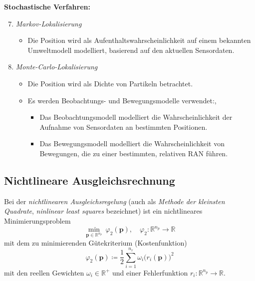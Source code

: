 \documentclass[a4paper, 11pt, accentcolor = tud3b]{tudreport}
\newcommand{\R}{\mathbb{R}}
\renewcommand{\vec}[1]{\boldsymbol{#1}}
\begin{document}
			\textbf{Stochastische Verfahren:}
			\begin{enumerate} \setcounter{enumi}{6}
				\item \emph{Markov-Lokalisierung}
					\begin{itemize}
						\item Die Position wird als Aufenthaltswahrscheinlichkeit auf einem bekannten Umweltmodell modelliert, basierend auf den aktuellen Sensordaten.
					\end{itemize}
				\item \emph{Monte-Carlo-Lokalisierung}
					\begin{itemize}
						\item Die Position wird als Dichte von Partikeln betrachtet.
						\item Es werden Beobachtungs- und Bewegungsmodelle verwendet:, 
							\begin{itemize}
								\item Das Beobachtungsmodell modelliert die Wahrscheinlichkeit der Aufnahme von Sensordaten an bestimmten Positionen.
								\item Das Bewegungsmodell modelliert die Wahrscheinlichkeit von Bewegungen, die zu einer bestimmten, relativen RAN führen.
							\end{itemize}
					\end{itemize}
			\end{enumerate}
		
			\subsection{Nichtlineare Ausgleichsrechnung}
				\label{sec:least_squares}
			
				Bei der \emph{nichtlinearen Ausgleichsregelung} (auch als \emph{Methode der kleinsten Quadrate}, \emph{ninlinear least squares} bezeichnet) ist ein nichtlineares Minimierungsproblem
				\begin{equation*}
					\min_{\vec{p} \in \R^{n_p}} \> \varphi_2(\vec{p}),\quad \varphi_2 : \R^{n_p} \to \R
				\end{equation*}
				mit dem zu minimierenden Gütekriterium (Kostenfunktion)
				\begin{equation*}
					\varphi_2(\vec{p}) \coloneqq \frac{1}{2} \sum_{i = 1}^{n_r} \omega_i \big(r_i(\vec{p})\big)^2
				\end{equation*}
				mit den reellen Gewichten \( \omega_i \in \R^+ \) und einer Fehlerfunktion \( r_i : \R^{n_p} \to \R \).
				
\end{document}
